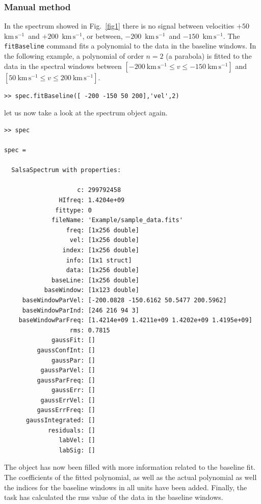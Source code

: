 \documentclass[11pt,a4paper]{article}
\newcommand\kms{$\mathrm{km} \, \mathrm{s}^{-1}$}
\newcommand\kmsmath{\mathrm{km} \, \mathrm{s}^{-1}}
\begin{document}
\subsubsection{Manual method}
\label{sec:manual-method}

In the spectrum showed in Fig.~\ref{fig1} there is no signal between
velocities $+50$~\kms~and $+200$~\kms, or between, $-200$~\kms~and 
$-150$~\kms. The \texttt{fitBaseline}
command fits a polynomial to the data in the baseline windows. In the
following example, a polynomial of order $n=2$ (a parabola) is
fitted to the data in the spectral windows between $[-200~\kmsmath
\leq {v} \leq -150~\kmsmath]$ and $\left[ 50~\kmsmath \leq {v} \leq
  200~\kmsmath \right]$.
\begin{lstlisting}
>> spec.fitBaseline([ -200 -150 50 200],'vel',2)
\end{lstlisting}
\noindent
let us now take a look at the spectrum object again. 

\begin{lstlisting}
>> spec

spec = 

  SalsaSpectrum with properties:

                    c: 299792458
               HIfreq: 1.4204e+09
              fittype: 0
             fileName: 'Example/sample_data.fits'
                 freq: [1x256 double]
                  vel: [1x256 double]
                index: [1x256 double]
                 info: [1x1 struct]
                 data: [1x256 double]
             baseLine: [1x256 double]
           baseWindow: [1x123 double]
     baseWindowParVel: [-200.0828 -150.6162 50.5477 200.5962]
     baseWindowParInd: [246 216 94 3]
    baseWindowParFreq: [1.4214e+09 1.4211e+09 1.4202e+09 1.4195e+09]
                  rms: 0.7815
             gaussFit: []
         gaussConfInt: []
             gaussPar: []
          gaussParVel: []
         gaussParFreq: []
             gaussErr: []
          gaussErrVel: []
         gaussErrFreq: []
      gaussIntegrated: []
            residuals: []
               labVel: []
               labSig: []

\end{lstlisting}

The object has now been filled with more information related to the
baseline fit. The coefficients of the fitted polynomial, as well as
the actual polynomial as well the indices for the baseline windows in
all units have been added. Finally, the task has calculated the rms
value of the data in the baseline windows.
\end{document}
